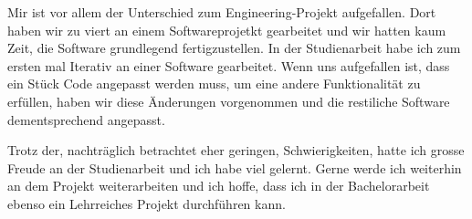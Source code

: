 \documentclass[]{subfiles}
\begin{document}
    Mir ist vor allem der Unterschied zum Engineering-Projekt aufgefallen. Dort haben wir zu 
    viert an einem Softwareprojetkt gearbeitet und wir hatten kaum Zeit, die Software grundlegend
    fertigzustellen. 
    In der Studienarbeit habe ich zum ersten mal Iterativ an einer Software gearbeitet.
    Wenn uns aufgefallen ist, dass ein Stück Code angepasst werden muss, um eine andere Funktionalität
    zu erfüllen, haben wir diese Änderungen vorgenommen und die restiliche Software dementsprechend angepasst.

    Trotz der, nachträglich betrachtet eher geringen, Schwierigkeiten, hatte ich grosse Freude an
    der Studienarbeit und ich habe viel gelernt. Gerne werde ich weiterhin an dem Projekt 
    weiterarbeiten und ich hoffe, dass ich in der Bachelorarbeit ebenso ein Lehrreiches Projekt
    durchführen kann.
    
\end{document}
